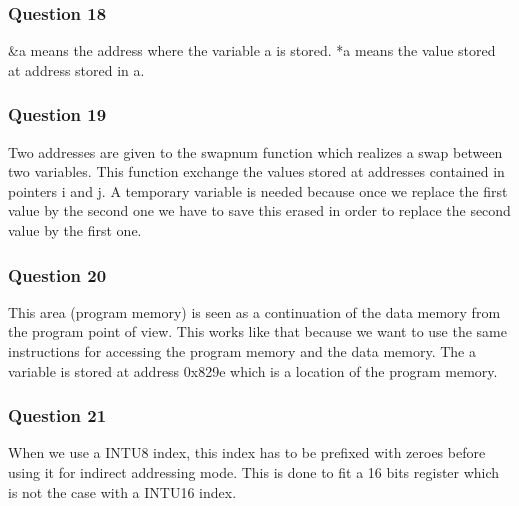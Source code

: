 \documentclass[a4paper,10pt]{article}
\begin{document}
\subsubsection*{Question 18}
\&a means the address where the variable a is stored. *a means the value stored at address stored in a.

\subsubsection*{Question 19}
Two addresses are given to the swapnum function which realizes a swap between two variables. This function exchange the values stored at addresses contained in pointers i and j. A temporary variable is needed because once we replace the first value by the second one we have to save this erased in order to replace the second value by the first one.

\subsubsection*{Question 20}
This area (program memory) is seen as a continuation of the data memory from the program point of view. This works like that because we want to use the same instructions for accessing the program memory and the data memory. The a variable is stored at address 0x829e which is a location of the program memory.

\subsubsection*{Question 21}
When we use a INTU8 index, this index has to be prefixed with zeroes before using it for indirect addressing mode. This is done to fit a 16 bits register which is not the case with a INTU16 index.
\end{document}

